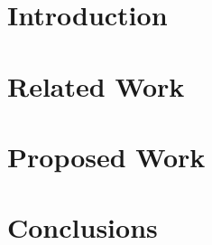 \section{Introduction}

\section{Related Work}

\section{Proposed Work}

\section{Conclusions}





